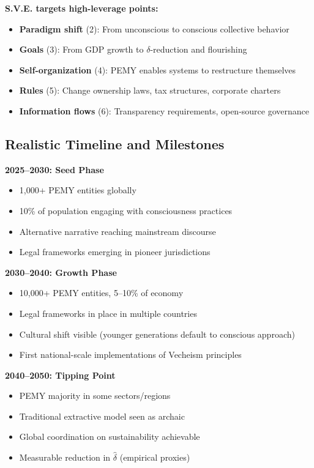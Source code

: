 \documentclass[11pt,a4paper]{article}
\theoremstyle{definition}
\theoremstyle{remark}
\begin{document}
\textbf{S.V.E. targets high-leverage points:}
\begin{itemize}[leftmargin=1.5em]
    \item \textbf{Paradigm shift} (2): From unconscious to conscious collective behavior
    \item \textbf{Goals} (3): From GDP growth to $\delta$-reduction and flourishing
    \item \textbf{Self-organization} (4): PEMY enables systems to restructure themselves
    \item \textbf{Rules} (5): Change ownership laws, tax structures, corporate charters
    \item \textbf{Information flows} (6): Transparency requirements, open-source governance
\end{itemize}

\subsection{Realistic Timeline and Milestones}

\textbf{2025--2030: Seed Phase}
\begin{itemize}[leftmargin=1.5em]
    \item 1,000+ PEMY entities globally
    \item 10\% of population engaging with consciousness practices
    \item Alternative narrative reaching mainstream discourse
    \item Legal frameworks emerging in pioneer jurisdictions
\end{itemize}

\textbf{2030--2040: Growth Phase}
\begin{itemize}[leftmargin=1.5em]
    \item 10,000+ PEMY entities, 5--10\% of economy
    \item Legal frameworks in place in multiple countries
    \item Cultural shift visible (younger generations default to conscious approach)
    \item First national-scale implementations of Vecheism principles
\end{itemize}

\textbf{2040--2050: Tipping Point}
\begin{itemize}[leftmargin=1.5em]
    \item PEMY majority in some sectors/regions
    \item Traditional extractive model seen as archaic
    \item Global coordination on sustainability achievable
    \item Measurable reduction in $\hat{\delta}$ (empirical proxies)
\end{itemize}
\end{document}
